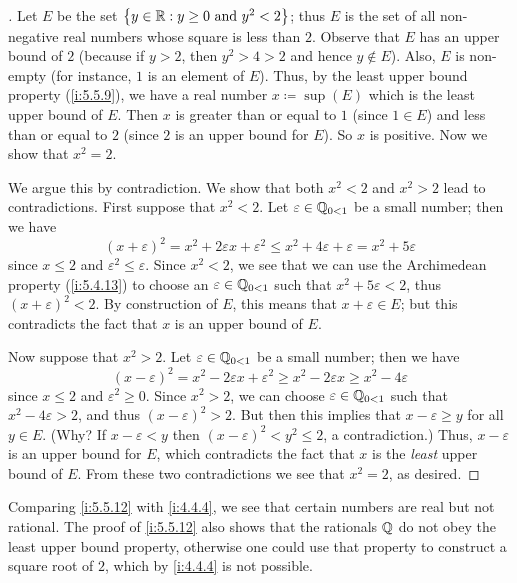 \begin{proof}[]
  Let \(E\) be the set \(\left\lbrace y \in \mathbb{R} : y \geq 0 \text{ and } y^2 < 2\right\rbrace\);
  thus \(E\) is the set of all non-negative real numbers whose square is less than \(2\).
  Observe that \(E\) has an upper bound of \(2\) (because if \(y > 2\), then \(y^2 > 4 > 2\) and hence \(y \notin E\)).
  Also, \(E\) is non-empty (for instance, \(1\) is an element of \(E\)).
  Thus, by the least upper bound property (\cref{i:5.5.9}), we have a real number \(x \coloneqq \sup(E)\) which is the least upper bound of \(E\).
  Then \(x\) is greater than or equal to \(1\) (since \(1 \in E\)) and less than or equal to \(2\)
  (since \(2\) is an upper bound for \(E\)).
  So \(x\) is positive.
  Now we show that \(x^2 = 2\).

  We argue this by contradiction.
  We show that both \(x^2 < 2\) and \(x^2 > 2\) lead to contradictions.
  First suppose that \(x^2 < 2\).
  Let \(\varepsilon \in \mathbb{Q}_{0 < 1}\) be a small number;
  then we have
  \[
    (x + \varepsilon)^2 = x^2 + 2\varepsilon x + \varepsilon^2 \leq x^2 + 4\varepsilon + \varepsilon = x^2 + 5\varepsilon
  \]
  since \(x \leq 2\) and \(\varepsilon^2 \leq \varepsilon\).
  Since \(x^2 < 2\), we see that we can use the Archimedean property (\cref{i:5.4.13}) to choose an \(\varepsilon \in \mathbb{Q}_{0 < 1}\) such that \(x^2 + 5\varepsilon < 2\), thus \((x + \varepsilon)^2 < 2\).
  By construction of \(E\), this means that \(x + \varepsilon \in E\);
  but this contradicts the fact that \(x\) is an upper bound of \(E\).

  Now suppose that \(x^2 > 2\).
  Let \(\varepsilon \in \mathbb{Q}_{0 < 1}\) be a small number;
  then we have
  \[
    (x - \varepsilon)^2 = x^2 - 2\varepsilon x + \varepsilon^2 \geq x^2 - 2\varepsilon x \geq x^2 - 4\varepsilon
  \]
  since \(x \leq 2\) and \(\varepsilon^2 \geq 0\).
  Since \(x^2 > 2\), we can choose \(\varepsilon \in \mathbb{Q}_{0 < 1}\) such that \(x^2 - 4\varepsilon > 2\), and thus \((x - \varepsilon)^2 > 2\).
  But then this implies that \(x - \varepsilon \geq y\) for all \(y \in E\).
  (Why? If \(x - \varepsilon < y\) then \((x - \varepsilon)^2 < y^2 \leq 2\), a contradiction.)
  Thus, \(x - \varepsilon\) is an upper bound for \(E\), which contradicts the fact that \(x\) is the \emph{least} upper bound of \(E\).
  From these two contradictions we see that \(x^2 = 2\), as desired.
\end{proof}

\begin{rmk}\label{i:5.5.13}
  Comparing \cref{i:5.5.12} with \cref{i:4.4.4}, we see that certain numbers are real but not rational.
  The proof of \cref{i:5.5.12} also shows that the rationals \(\mathbb{Q}\) do not obey the least upper bound property, otherwise one could use that property to construct a square root of \(2\), which by \cref{i:4.4.4} is not possible.
\end{rmk}

